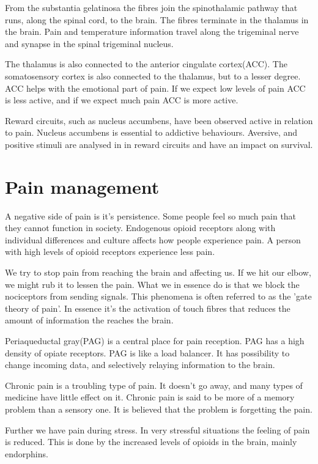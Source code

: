 \documentclass[12pt, a4paper]{article}
\begin{document}
From the substantia gelatinosa the fibres join the spinothalamic pathway that
runs, along the spinal cord, to the brain. The fibres terminate in the thalamus
in the brain. Pain and temperature information travel along the trigeminal
nerve and synapse in the spinal trigeminal nucleus. 

The thalamus is also connected to the anterior cingulate cortex(ACC). The
somatosensory cortex is also connected to the thalamus, but to a lesser degree.
ACC helps with the emotional part of pain. If we expect low levels of pain ACC
is less active, and if we expect much pain ACC is more active. 

Reward circuits, such as nucleus accumbens, have been observed active in relation
to pain. Nucleus accumbens is essential to addictive behaviours. Aversive, and
positive stimuli are analysed in in reward circuits and have an impact on
survival. 

\section{Pain management}
A negative side of pain is it's persistence. Some people feel so much pain that
they cannot function in society. Endogenous opioid receptors along with
individual differences and culture affects how people experience pain. A person
with high levels of opioid receptors experience less pain. 

We try to stop pain from reaching the brain and affecting us. If we hit our
elbow, we might rub it to lessen the pain. What we in essence do is that we
block the nociceptors from sending signals. This phenomena is often referred to
as the 'gate theory of pain'. In essence it's the activation of touch fibres
that reduces the amount of information the reaches the brain. 

Periaqueductal gray(PAG) is a central place for pain reception. PAG has a high
density of opiate receptors. PAG is like a load balancer. It has possibility to
change incoming data, and selectively relaying information to the brain.  

Chronic pain is a troubling type of pain. It doesn't go away, and many types of
medicine have little effect on it. Chronic pain is said to be more of a memory
problem than a sensory one. It is believed that the problem is forgetting the
pain. 

Further we have pain during stress. In very stressful situations the feeling of
pain is reduced. This is done by the increased levels of opioids in the brain,
mainly endorphins. 
\end{document}
